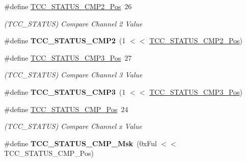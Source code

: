 \begin{DoxyCompactItemize}
\item 
\hypertarget{group___s_a_m_l21___t_c_c_gac72989f227df9c9ade62d6af9ac211ae}{}\#define \hyperlink{group___s_a_m_l21___t_c_c_gac72989f227df9c9ade62d6af9ac211ae}{T\+C\+C\+\_\+\+S\+T\+A\+T\+U\+S\+\_\+\+C\+M\+P2\+\_\+\+Pos}~26\label{group___s_a_m_l21___t_c_c_gac72989f227df9c9ade62d6af9ac211ae}

\begin{DoxyCompactList}\small\item\em (T\+C\+C\+\_\+\+S\+T\+A\+T\+U\+S) Compare Channel 2 Value \end{DoxyCompactList}\item 
\hypertarget{group___s_a_m_l21___t_c_c_ga80460c4b4415a09e1f633ef191a0085f}{}\#define {\bfseries T\+C\+C\+\_\+\+S\+T\+A\+T\+U\+S\+\_\+\+C\+M\+P2}~(1 $<$$<$ \hyperlink{group___s_a_m_l21___t_c_c_gac72989f227df9c9ade62d6af9ac211ae}{T\+C\+C\+\_\+\+S\+T\+A\+T\+U\+S\+\_\+\+C\+M\+P2\+\_\+\+Pos})\label{group___s_a_m_l21___t_c_c_ga80460c4b4415a09e1f633ef191a0085f}

\item 
\hypertarget{group___s_a_m_l21___t_c_c_gae98b3b22eb16b47cad3a7b880dbb352b}{}\#define \hyperlink{group___s_a_m_l21___t_c_c_gae98b3b22eb16b47cad3a7b880dbb352b}{T\+C\+C\+\_\+\+S\+T\+A\+T\+U\+S\+\_\+\+C\+M\+P3\+\_\+\+Pos}~27\label{group___s_a_m_l21___t_c_c_gae98b3b22eb16b47cad3a7b880dbb352b}

\begin{DoxyCompactList}\small\item\em (T\+C\+C\+\_\+\+S\+T\+A\+T\+U\+S) Compare Channel 3 Value \end{DoxyCompactList}\item 
\hypertarget{group___s_a_m_l21___t_c_c_ga51a78bea87bbbf4755d8540928391288}{}\#define {\bfseries T\+C\+C\+\_\+\+S\+T\+A\+T\+U\+S\+\_\+\+C\+M\+P3}~(1 $<$$<$ \hyperlink{group___s_a_m_l21___t_c_c_gae98b3b22eb16b47cad3a7b880dbb352b}{T\+C\+C\+\_\+\+S\+T\+A\+T\+U\+S\+\_\+\+C\+M\+P3\+\_\+\+Pos})\label{group___s_a_m_l21___t_c_c_ga51a78bea87bbbf4755d8540928391288}

\item 
\hypertarget{group___s_a_m_l21___t_c_c_ga2ee88bac67f161f5c938354bdb3fbce1}{}\#define \hyperlink{group___s_a_m_l21___t_c_c_ga2ee88bac67f161f5c938354bdb3fbce1}{T\+C\+C\+\_\+\+S\+T\+A\+T\+U\+S\+\_\+\+C\+M\+P\+\_\+\+Pos}~24\label{group___s_a_m_l21___t_c_c_ga2ee88bac67f161f5c938354bdb3fbce1}

\begin{DoxyCompactList}\small\item\em (T\+C\+C\+\_\+\+S\+T\+A\+T\+U\+S) Compare Channel x Value \end{DoxyCompactList}\item 
\hypertarget{group___s_a_m_l21___t_c_c_ga81c5ab0be264011748ee6de76bab4794}{}\#define {\bfseries T\+C\+C\+\_\+\+S\+T\+A\+T\+U\+S\+\_\+\+C\+M\+P\+\_\+\+Msk}~(0x\+Ful $<$$<$ T\+C\+C\+\_\+\+S\+T\+A\+T\+U\+S\+\_\+\+C\+M\+P\+\_\+\+Pos)\label{group___s_a_m_l21___t_c_c_ga81c5ab0be264011748ee6de76bab4794}


\end{DoxyCompactItemize}
